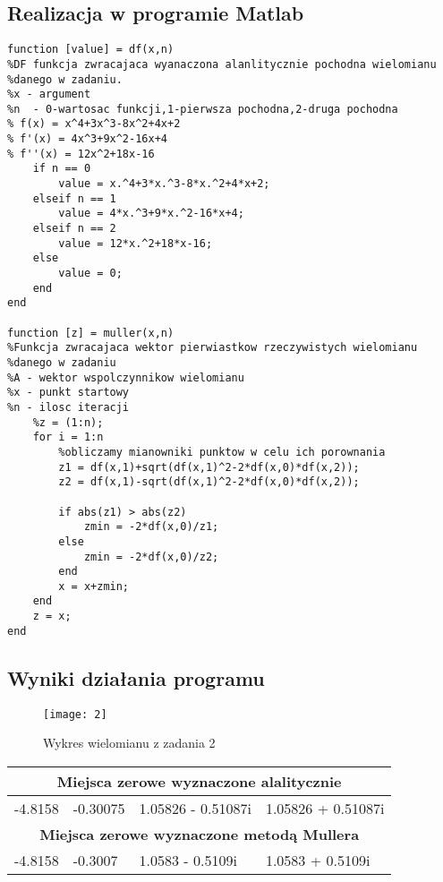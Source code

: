 \documentclass[a4paper, 11pt]{article}
\begin{document}
\subsection{Realizacja w programie Matlab}
\begin{lstlisting}
function [value] = df(x,n)
%DF funkcja zwracajaca wyanaczona alanlitycznie pochodna wielomianu
%danego w zadaniu. 
%x - argument
%n  - 0-wartosac funkcji,1-pierwsza pochodna,2-druga pochodna
% f(x) = x^4+3x^3-8x^2+4x+2
% f'(x) = 4x^3+9x^2-16x+4
% f''(x) = 12x^2+18x-16
    if n == 0
        value = x.^4+3*x.^3-8*x.^2+4*x+2; 
    elseif n == 1
        value = 4*x.^3+9*x.^2-16*x+4;
    elseif n == 2
        value = 12*x.^2+18*x-16;
    else
        value = 0; 
    end
end

function [z] = muller(x,n)
%Funkcja zwracajaca wektor pierwiastkow rzeczywistych wielomianu
%danego w zadaniu
%A - wektor wspolczynnikow wielomianu
%x - punkt startowy
%n - ilosc iteracji
    %z = (1:n); 
    for i = 1:n
        %obliczamy mianowniki punktow w celu ich porownania
        z1 = df(x,1)+sqrt(df(x,1)^2-2*df(x,0)*df(x,2));
        z2 = df(x,1)-sqrt(df(x,1)^2-2*df(x,0)*df(x,2)); 
    
        if abs(z1) > abs(z2)
            zmin = -2*df(x,0)/z1; 
        else 
            zmin = -2*df(x,0)/z2;
        end 
        x = x+zmin; 
    end
    z = x; 
end

\end{lstlisting}

\vspace{1cm}

\subsection{Wyniki działania programu}

\begin{figure}[H]
\caption{Wykres wielomianu z zadania 2}
\texttt{[image: 2]}
\end{figure}

\begin{table}[H]
\centering
\label{my-label}
\begin{tabular}{|l|l|l|l|}
\hline
\multicolumn{4}{|c|}{\textbf{Miejsca zerowe wyznaczone alalitycznie}} \\ \hline
-4.8158 & -0.30075 & 1.05826 - 0.51087i & 1.05826 + 0.51087i \\ \hline
\multicolumn{4}{|c|}{\textbf{Miejsca zerowe wyznaczone metodą Mullera}} \\ \hline
-4.8158 & -0.3007 & 1.0583 - 0.5109i & 1.0583 + 0.5109i \\ \hline
\end{tabular}
\end{table}
\end{document}
